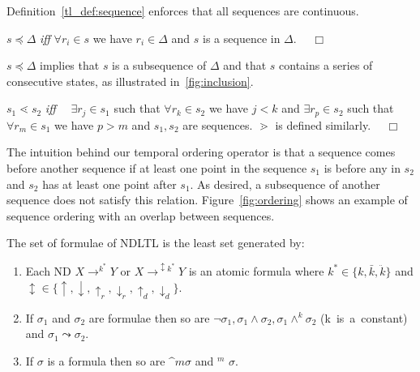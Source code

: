 Definition~\ref{tl_def:sequence} enforces that all sequences are
continuous. 

\begin{definition}\label{tl_def:inclusion}
\begin{rm}
$s \preceq \Delta$ {\em iff} $\forall r_i \in s$ we have $r_i \in \Delta$
and $s$ is a sequence in $\Delta$. $\quad\Box$
\end{rm}
\end{definition}

$s \preceq \Delta$ implies that $s$ is a subsequence of $\Delta$ and
that $s$ contains a series of consecutive states, as illustrated in~\ref{fig:inclusion}.

\begin{definition}
\begin{rm}
$s_1 \lessdot s_2$ {\em iff} $\quad \exists r_j \in s_1$ such that $\forall r_k
\in s_2$ we have $j < k$ and $\exists r_p \in s_2$ such that $\forall r_m
\in s_1$ we have $p > m$ and $s_1,s_2$ are sequences. $\gtrdot$ is
defined similarly. $\quad\Box$ 
\end{rm}
\end{definition}

The intuition behind our temporal ordering operator is that a sequence
comes before another sequence if at least one point in the sequence
$s_1$ is
before any in $s_2$ and $s_2$ has at least one point after $s_1$. As
desired, a subsequence of another sequence does not satisfy this
relation. Figure~\ref{fig:ordering} shows an example of sequence
ordering with an overlap between sequences.


The set of formulae of NDLTL is the
least set generated by:
\begin{enumerate}
\item Each ND $X \to^{{k}^\ast} Y$ or $X \to^{\updownarrow
{k}^\ast} Y$ is an atomic formula where ${k}^\ast \in \{ k,
\bar{{k}}, \ddot{{k}} \}$
  and $\updownarrow  \in \{ \uparrow,
\downarrow, \uparrow_r,\downarrow_r,\uparrow_d,\downarrow_d \}$.
\item If $\sigma_1$ and $\sigma_2$ are formulae then so are $\neg \sigma_1,
\sigma_1 \wedge \sigma_2, \sigma_1 \wedge^k \sigma_2$ (\mbox{k is a
constant}) and $\sigma_1 \leadsto \sigma_2$. 
\item If $\sigma$ is a formula then so are $\bm^m \sigma$ and  \diam$^m$ 
$\sigma$.
\end{enumerate}

